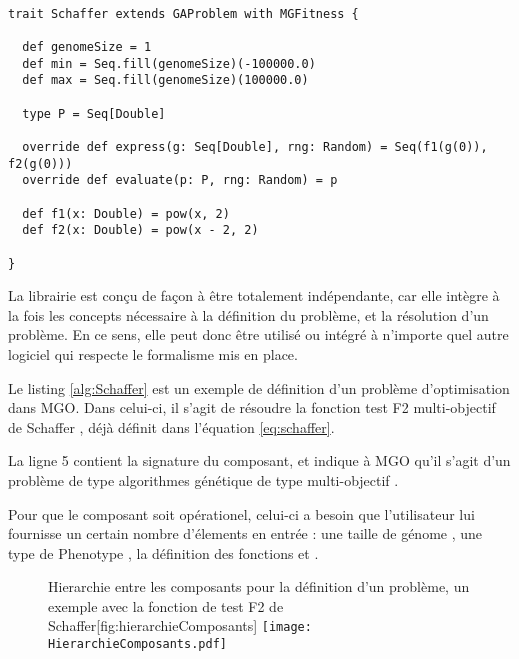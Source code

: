 \begin{listing}[!htbp]

\begin{verbatim}

trait Schaffer extends GAProblem with MGFitness {

  def genomeSize = 1
  def min = Seq.fill(genomeSize)(-100000.0)
  def max = Seq.fill(genomeSize)(100000.0)

  type P = Seq[Double]

  override def express(g: Seq[Double], rng: Random) = Seq(f1(g(0)), f2(g(0)))
  override def evaluate(p: P, rng: Random) = p

  def f1(x: Double) = pow(x, 2)
  def f2(x: Double) = pow(x - 2, 2)

}

\end{verbatim}
\caption{Exemple de définition d'un problème multi-objectifs dans MGO}
\label{alg:Schaffer}
\end{listing}

La librairie est conçu de façon à être totalement indépendante, car elle intègre à la fois les concepts nécessaire à la définition du problème, et la résolution d'un problème. En ce sens, elle peut donc être utilisé ou intégré à n'importe quel autre logiciel qui respecte le formalisme mis en place.

Le listing \ref{alg:Schaffer} est un exemple de définition d'un problème d'optimisation dans MGO. Dans celui-ci, il s'agit de résoudre la fonction test F2 multi-objectif de Schaffer \textcite[94]{Schaffer1985}, déjà définit dans l'équation \ref{eq:schaffer}.

La ligne 5 contient la signature du composant, et indique à MGO qu'il s'agit d'un problème de type algorithmes génétique  de type multi-objectif .

Pour que le composant  soit opérationel, celui-ci a besoin que l'utilisateur lui fournisse un certain nombre d'élements en entrée : une taille de génome , une type de Phenotype , la définition des fonctions  et .

\begin{figure}[ht]
	\begin{sidecaption}[fortoc]{Hierarchie entre les composants pour la définition d'un problème, un exemple avec la fonction de test F2 de Schaffer}[fig:hierarchieComposants]
	 \centering
	 	\texttt{[image: HierarchieComposants.pdf]}
	\end{sidecaption}
\end{figure}


